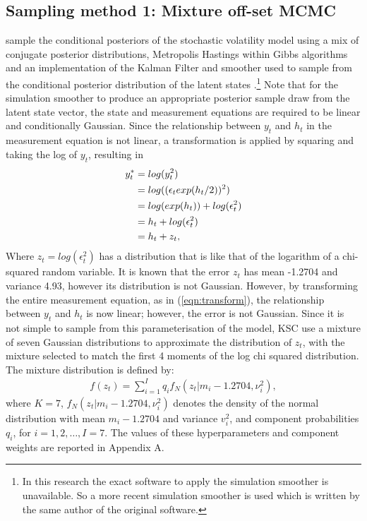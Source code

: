 \documentclass[12pt, a4paper]{article}
\begin{document}
    \subsection{Sampling method 1: Mixture off-set MCMC}
        \citet{kim1998stochastic} sample the conditional posteriors of the stochastic volatility model using a mix of conjugate posterior distributions, Metropolis Hastings within Gibbs algorithms and an implementation of the Kalman Filter and smoother used to sample from the conditional posterior distribution of the latent states \citep{dejong1995}.\footnote{In this research the exact software to apply the simulation smoother is unavailable. So a more recent simulation smoother is used which is written by the same author of the original software.} Note that for the simulation smoother to produce an appropriate posterior sample draw from the latent state vector, the state and measurement equations are required to be linear and conditionally Gaussian. Since the relationship between $y_t$ and $h_t$ in the measurement equation is not linear, a transformation is applied by squaring and taking the log of $y_t$, resulting in
        \begin{align}
        y_t^{*} &= log(y_t^2) \notag\\ 
        &= log((\epsilon_t exp(h_t/2))^2) \notag\\
        &=  log(exp(h_t)) + log(\epsilon_t^2) \notag\\
        &= h_t + log(\epsilon_t^2) \notag  \\
        &= h_t + z_t,  \label{eqn:transform}
        \end{align}
        Where $z_t = log(\epsilon_t^2)$ has a distribution that is like that of the logarithm of a chi-squared random variable. It is known that the error $z_t$ has mean -1.2704 and variance 4.93, however its distribution is not Gaussian. However, by transforming the entire measurement equation, as in (\ref{eqn:transform}), the relationship between $y_t$ and $h_t$ is now linear; however, the error is not Gaussian. Since it is not simple to sample from this parameterisation of the model, KSC use a mixture of seven Gaussian distributions to approximate the distribution of $z_t$, with the mixture selected to match the first 4 moments of the log chi squared distribution. The mixture distribution is defined by:
        \begin{align}
        f(z_t) = \sum_{i=1}^{I} q_if_N(z_t|m_i-1.2704, \nu_i^2),
        \end{align}
        where $K=7$, $f_N(z_t|m_i-1.2704, \nu_i^2)$ denotes the density of the normal distribution with mean $m_i-1.2704$ and variance $v_i^2$, and  component probabilities $q_i$, for $i=1,2,\ldots, I=7$.  The values of these hyperparameters and component weights are reported in Appendix A.
\end{document}
